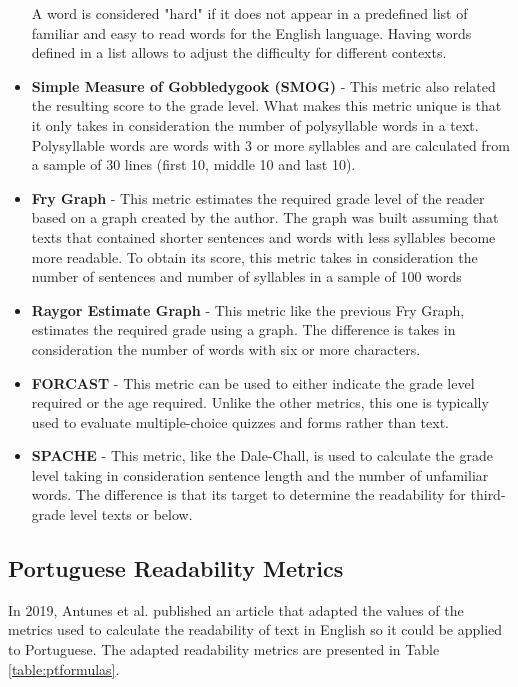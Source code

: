 \begin{itemize}
        A word is considered "hard" if it does not appear in a predefined list of familiar and easy to read words for the English language.
        Having words defined in a list allows to adjust the difficulty for different contexts.
    \item \textbf{Simple Measure of Gobbledygook (SMOG)} - This metric also related the resulting score to the grade level.
        What makes this metric unique is that it only takes in consideration the number of polysyllable words in a text.
        Polysyllable words are words with 3 or more syllables and are calculated from a sample of 30 lines (first 10, middle 10 and last 10).
    \item \textbf{Fry Graph} - This metric estimates the required grade level of the reader based on a graph created by the author.
        The graph was built assuming that texts that contained shorter sentences and words with less syllables become more readable.
        To obtain its score, this metric takes in consideration the number of sentences and number of syllables in a sample of 100 words
    \item \textbf{Raygor Estimate Graph} - This metric like the previous Fry Graph, estimates the required grade using a graph.
        The difference is takes in consideration the number of words with six or more characters.
    \item \textbf{FORCAST} - This metric can be used to either indicate the grade level required or the age required.
        Unlike the other metrics, this one is typically used to evaluate multiple-choice quizzes and forms rather than text.
    \item \textbf{SPACHE} - This metric, like the Dale-Chall, is used to calculate the grade level taking in consideration sentence length and the number of unfamiliar words.
        The difference is that its target to determine the readability for third-grade level texts or below.
\end{itemize}

\subsection{Portuguese Readability Metrics}

In 2019, Antunes et al.\cite{antunes2019analyzing} published an article that adapted the values of the metrics used to calculate the readability of text in English so it could be applied to Portuguese.
The adapted readability metrics are presented in Table \ref{table:ptformulas}.

